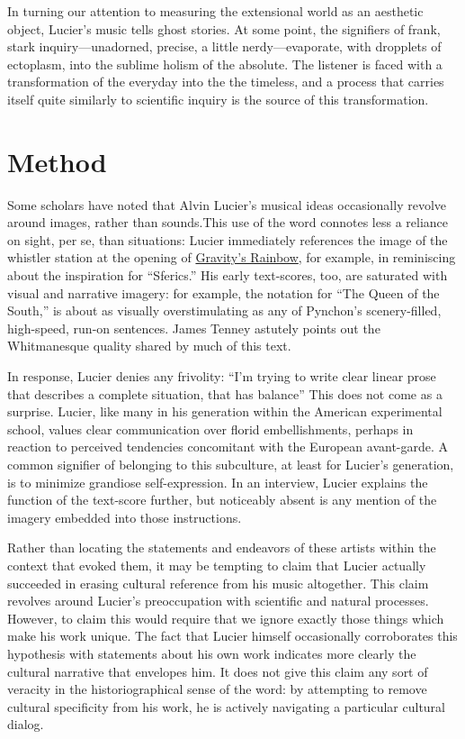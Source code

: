 \documentclass[a4paper,10pt]{report}
\numberwithin{equation}{section}
\begin{document}
In turning our attention to measuring the extensional world as an aesthetic object, Lucier's music tells ghost stories. At some point, the signifiers of frank, stark inquiry---unadorned, precise, a little nerdy---evaporate, with dropplets of ectoplasm, into the sublime holism of the absolute. The listener is faced with a transformation of the everyday into the the timeless, and a process that carries itself quite similarly to scientific inquiry is the source of this transformation. 
\section{Method}
 Some scholars have noted that Alvin Lucier's musical ideas occasionally revolve around images, rather than sounds.\cite{kuivila2012}This use of the word connotes less a reliance on sight, per se, than situations: Lucier immediately references the image of the whistler station at the opening of \underline{Gravity's Rainbow}, for example, in reminiscing about the inspiration for ``Sferics.''\cite[p.~151]{lucier2012} His early text-scores, too, are saturated with visual and narrative imagery: for example, the notation for ``The Queen of the South,'' is about as visually overstimulating as any of Pynchon's scenery-filled, high-speed, run-on sentences.\cite[350-352]{lucier1995} James Tenney astutely points out the Whitmanesque quality shared by much of this text.\cite[p.~16]{lucier1995}

In response, Lucier denies any frivolity: ``I'm trying to write clear linear prose that describes a complete situation, that has balance''\cite[p.~16]{lucier1995} This does not come as a surprise. Lucier, like many in his generation within the American experimental school, values clear communication over florid embellishments, perhaps in reaction to perceived tendencies concomitant with the European avant-garde. A common signifier of belonging to this subculture, at least for Lucier's generation, is to minimize grandiose self-expression. In an interview, Lucier explains the function of the text-score further, but noticeably absent is any mention of the imagery embedded into those instructions.\cite[p.~138]{lucier1995}

Rather than locating the statements and endeavors of these artists within the context that evoked them, it may be tempting to claim that Lucier actually succeeded in erasing cultural reference from his music altogether. This claim revolves around Lucier's preoccupation with scientific and natural processes.\cite{yang2012} However, to claim this would require that we ignore exactly those things which make his work unique. The fact that Lucier himself occasionally corroborates this hypothesis with statements about his own work indicates more clearly the cultural narrative that envelopes him. It does not give this claim any sort of veracity in the historiographical sense of the word: by attempting to remove cultural specificity from his work, he is actively navigating a particular cultural dialog. 
\end{document}
